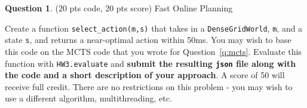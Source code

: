 \documentclass{article}
\theoremstyle{definition}
\newtheorem{question}[thm]{Question}
\begin{document}
\begin{question}
    (20 pts code, 20 pts score) Fast Online Planning
    
    Create a function \texttt{select\_action(m,s)} that takes in a \texttt{DenseGridWorld}, \texttt{m}, and a state \texttt{s}, and returns a near-optimal action within 50ms. You may wish to base this code on the MCTS code that you wrote for Question~\ref{q:mcts}. Evaluate this function with \texttt{HW3.evaluate} and \textbf{submit the resulting \texttt{json} file along with the code and a short description of your approach}. A score of 50 will receive full credit. There are no restrictions on this problem - you may wish to use a different algorithm, multithreading, etc.
\end{question}
\end{document}
